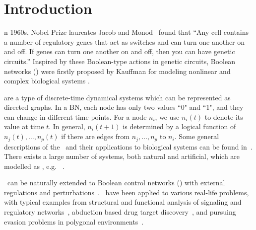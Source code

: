 

\section{Introduction}
\label{sec:intro}


n 1960s, Nobel Prize laureates Jacob and Monod~\cite{Jacob1961Genetic} found that ``Any cell contains a number of regulatory genes that act as switches and can turn one another on and off. If genes can turn one another on and off, then you can have genetic circuits.'' Inspired by these Boolean-type actions in genetic circuits, Boolean networks (\BNs) were firstly proposed by Kauffman for modeling nonlinear and complex biological systems \cite{Kauffman1968Metabolic}. 

{\BNs} are a type of discrete-time dynamical systems which can be represented as directed graphs. In a BN, each node has only two values ``0" and ``1", and they can change in different time points.  For a node $n_i$, we use $n_i(t)$ to denote its value at time $t$.
In general, $n_i(t+1)$ is determined by a logical function of $n_j(t),\ldots,n_p(t)$ if  there are  edges from $n_j,\ldots,n_p$ to $n_i$.  
Some general descriptions of the \BNs\ and their applications to biological systems can be found in~\cite{Kauffman1968Metabolic}. There exists a large number of  systems, both natural and artificial, which are modelled as \BNs, e.g. ~\cite{Akutsu2000Inferring, Shmulevich2002From, Faur2006Dynamical,Green2007The,Lou2010Multi}.

\BNs\ can be naturally extended to Boolean control networks (\BCNs) with external regulations and perturbations~\cite{Ideker2001A}. \BCNs\ have been applied to  various real-life problems, %
with typical examples from  structural and functional analysis of signaling and regulatory networks~\cite{Kaufman1999A, Klamt2006A}, 
abduction based drug target discovery~\cite{Biane2017Abduction}, 
and pursuing evasion problems in polygonal environments~\cite{Thunberg2011A}.
%

